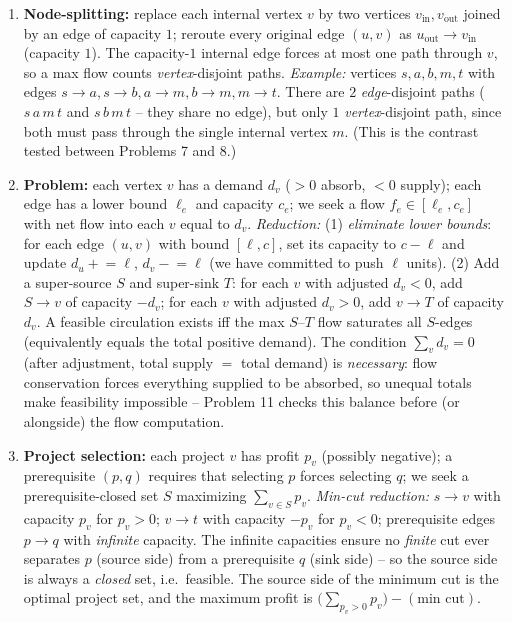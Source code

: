 \documentclass[11pt]{article}
\begin{document}
\begin{enumerate}[label=\textbf{A\arabic*.}, leftmargin=2.2em]
\item \textbf{Node-splitting:} replace each internal vertex $v$ by two vertices
$v_{\text{in}}, v_{\text{out}}$ joined by an edge of capacity $1$; reroute every
original edge $(u,v)$ as $u_{\text{out}} \to v_{\text{in}}$ (capacity $1$). The
capacity-$1$ internal edge forces at most one path through $v$, so a max flow
counts \emph{vertex}-disjoint paths. \emph{Example:} vertices $s, a, b, m, t$
with edges $s\to a, s\to b, a\to m, b\to m, m\to t$. There are $2$
\emph{edge}-disjoint paths ($s\,a\,m\,t$ and $s\,b\,m\,t$ -- they share no edge),
but only $1$ \emph{vertex}-disjoint path, since both must pass through the single
internal vertex $m$. (This is the contrast tested between Problems 7 and 8.)

\item \textbf{Problem:} each vertex $v$ has a demand $d_v$ ($>0$ absorb, $<0$
supply); each edge has a lower bound $\ell_e$ and capacity $c_e$; we seek a flow
$f_e \in [\ell_e, c_e]$ with net flow into each $v$ equal to $d_v$.
\emph{Reduction:} (1) \emph{eliminate lower bounds}: for each edge $(u,v)$ with
bound $[\ell, c]$, set its capacity to $c - \ell$ and update $d_u \mathrel{+}=
\ell$, $d_v \mathrel{-}= \ell$ (we have committed to push $\ell$ units). (2) Add
a super-source $S$ and super-sink $T$: for each $v$ with adjusted $d_v < 0$, add
$S \to v$ of capacity $-d_v$; for each $v$ with adjusted $d_v > 0$, add $v \to T$
of capacity $d_v$. A feasible circulation exists iff the max $S$--$T$ flow
saturates all $S$-edges (equivalently equals the total positive demand). The
condition $\sum_v d_v = 0$ (after adjustment, total supply $=$ total demand) is
\emph{necessary}: flow conservation forces everything supplied to be absorbed,
so unequal totals make feasibility impossible -- Problem 11 checks this balance
before (or alongside) the flow computation.

\item \textbf{Project selection:} each project $v$ has profit $p_v$ (possibly
negative); a prerequisite $(p,q)$ requires that selecting $p$ forces selecting
$q$; we seek a prerequisite-closed set $S$ maximizing $\sum_{v\in S} p_v$.
\emph{Min-cut reduction:} $s \to v$ with capacity $p_v$ for $p_v > 0$;
$v \to t$ with capacity $-p_v$ for $p_v < 0$; prerequisite edges $p \to q$ with
\emph{infinite} capacity. The infinite capacities ensure no \emph{finite} cut
ever separates $p$ (source side) from a prerequisite $q$ (sink side) -- so the
source side is always a \emph{closed} set, i.e.\ feasible. The source side of the
minimum cut is the optimal project set, and the maximum profit is
$\big(\sum_{p_v>0} p_v\big) - (\text{min cut})$.


\end{enumerate}
\end{document}
